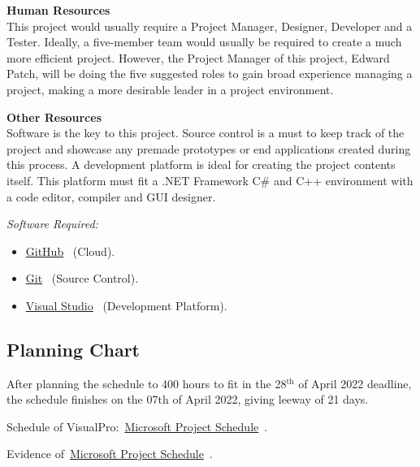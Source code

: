 \documentclass[conference]{IEEEtran}
\begin{document}
        \textbf{Human Resources}\\
          This project would usually require a Project Manager, Designer, Developer and a Tester. Ideally, a five-member team would usually be required to create a much more efficient project. However, the Project Manager of this project, Edward Patch, will be doing the five suggested roles to gain broad experience managing a project, making a more desirable leader in a project environment. 

        \textbf{Other Resources}\\
        Software is the key to this project. Source control is a must to keep track of the project and showcase any premade prototypes or end applications created during this process. A development platform is ideal for creating the project contents itself. This platform must fit a .NET Framework C\# and C++ environment with a code editor, compiler and GUI designer. 

        \textit{Software Required:}
        \begin{itemize}
          \item \href{https://github.com/}{GitHub}~\cite{github_github_nodate} (Cloud).
          \item \href{https://git-scm.com/}{Git}~\cite{git_git_nodate} (Source Control).
          \item \href{https://visualstudio.microsoft.com/}{Visual Studio}~\cite{microsoft_visual_nodate} (Development Platform).
        \end{itemize}

      \begin{landscape}
        \thispagestyle{fancylandscape}
        \subsection{Planning Chart}
        \label{subsec:rp-planningChart}
          After planning the schedule to 400 hours to fit in the 28$^{\text{th}}$ of April 2022 deadline, the schedule finishes on the 07${\text{th}}$ of April 2022, giving leeway of 21 days. 

          Schedule of VisualPro:~\href{https://github.com/ShinkuKira21/VisualPro-FinalProject/blob/main/Project/VisualPro.mpp?raw=true}{Microsoft Project Schedule}~\cite{patch_visualpro_2021}.
          
          Evidence of~\href{https://github.com/ShinkuKira21/VisualPro-FinalProject/blob/main/Project/Plan.docx?raw=true}{Microsoft Project Schedule}~\cite{patch_visualpro_2021-1}.

      \end{landscape}
\end{document}
